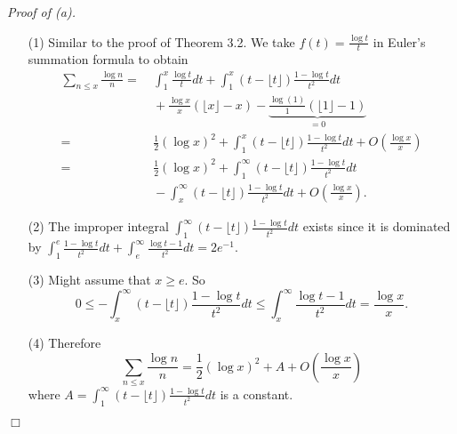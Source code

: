 \documentclass{article}
\begin{document}
\emph{Proof of (a).}
\begin{enumerate}
\item[(1)]
  Similar to the proof of Theorem 3.2.
  We take $f(t) = \frac{\log t}{t}$ in Euler's summation formula to obtain
  \begin{align*}
    \sum_{n \leq x} \frac{\log n}{n}
    = & \: \int_{1}^{x} \frac{\log t}{t} dt
        + \int_{1}^{x}(t-\lfloor t \rfloor)\frac{1-\log t}{t^2} dt \\
      & \: + \frac{\log x}{x}(\lfloor x \rfloor-x) 
          - \underbrace{\frac{\log(1)}{1}(\lfloor 1 \rfloor-1)}_{= 0} \\
    = & \: \frac{1}{2} (\log x)^2
        + \int_{1}^{x}(t-\lfloor t \rfloor)\frac{1-\log t}{t^2} dt + O\left( \frac{\log x}{x} \right) \\
    = & \: \frac{1}{2} (\log x)^2 + \int_{1}^{\infty}(t-\lfloor t \rfloor)\frac{1-\log t}{t^2} dt \\
      & \: - \int_{x}^{\infty}(t-\lfloor t \rfloor)\frac{1-\log t}{t^2} dt + O\left( \frac{\log x}{x} \right).
  \end{align*}

\item[(2)]
  The improper integral $\int_{1}^{\infty}(t-\lfloor t \rfloor)\frac{1-\log t}{t^2} dt$
  exists since it is dominated by
  $\int_{1}^{e} \frac{1-\log t}{t^2} dt + \int_{e}^{\infty} \frac{\log t - 1}{t^2} dt = 2e^{-1}$.

\item[(3)]
  Might assume that $x \geq e$.
  So
  \[
    0
    \leq -\int_{x}^{\infty}(t-\lfloor t \rfloor)\frac{1-\log t}{t^2} dt
    \leq \int_{x}^{\infty}\frac{\log t - 1}{t^2} dt
    = \frac{\log x}{x}.
  \]

\item[(4)]
  Therefore
  \[
    \sum_{n \leq x} \frac{\log n}{n}
    = \frac{1}{2} (\log x)^2 + A + O\left( \frac{\log x}{x} \right)
  \]
  where $A = \int_{1}^{\infty}(t-\lfloor t \rfloor)\frac{1-\log t}{t^2} dt$ is a constant.
\end{enumerate}
$\Box$ \\
\end{document}
